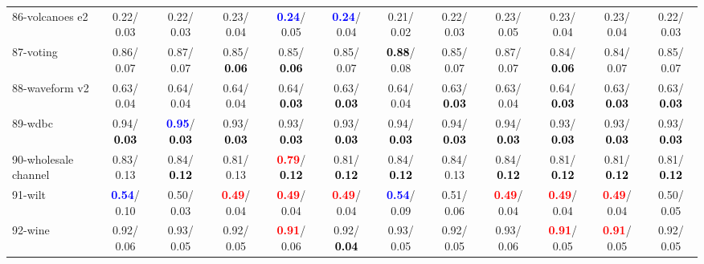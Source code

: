 \begin{table}[h]
\begin{center}
{\begin{tabular}{lc|c|c|c|c|c|c|c|c|c|c}
86-volcanoes e2 &   0.22/  0.03 &   0.22/  0.03 &   0.23/  0.04 & \textcolor{blue}{\textbf{  0.24}}/  0.05 & \textcolor{blue}{\textbf{  0.24}}/  0.04 &   0.21/  0.02 &   0.22/  0.03 &   0.23/  0.05 &   0.23/  0.04 &   0.23/  0.04 &   0.22/  0.03 \\
87-voting &   0.86/  0.07 &   0.87/  0.07 &   0.85/\textcolor{black}{\textbf{  0.06}} &   0.85/\textcolor{black}{\textbf{  0.06}} &   0.85/  0.07 & \textcolor{black}{\textbf{  0.88}}/  0.08 &   0.85/  0.07 &   0.87/  0.07 &   0.84/\textcolor{black}{\textbf{  0.06}} &   0.84/  0.07 &   0.85/  0.07 \\
88-waveform v2 &   0.63/  0.04 &   0.64/  0.04 &   0.64/  0.04 &   0.64/\textcolor{black}{\textbf{  0.03}} &   0.63/\textcolor{black}{\textbf{  0.03}} &   0.64/  0.04 &   0.63/\textcolor{black}{\textbf{  0.03}} &   0.63/  0.04 &   0.64/\textcolor{black}{\textbf{  0.03}} &   0.63/\textcolor{black}{\textbf{  0.03}} &   0.63/\textcolor{black}{\textbf{  0.03}} \\
89-wdbc &   0.94/\textcolor{black}{\textbf{  0.03}} & \textcolor{blue}{\textbf{  0.95}}/\textcolor{black}{\textbf{  0.03}} &   0.93/\textcolor{black}{\textbf{  0.03}} &   0.93/\textcolor{black}{\textbf{  0.03}} &   0.93/\textcolor{black}{\textbf{  0.03}} &   0.94/\textcolor{black}{\textbf{  0.03}} &   0.94/\textcolor{black}{\textbf{  0.03}} &   0.94/\textcolor{black}{\textbf{  0.03}} &   0.93/\textcolor{black}{\textbf{  0.03}} &   0.93/\textcolor{black}{\textbf{  0.03}} &   0.93/\textcolor{black}{\textbf{  0.03}} \\
90-wholesale channel &   0.83/  0.13 &   0.84/\textcolor{black}{\textbf{  0.12}} &   0.81/  0.13 & \textcolor{red}{\textbf{  0.79}}/\textcolor{black}{\textbf{  0.12}} &   0.81/\textcolor{black}{\textbf{  0.12}} &   0.84/\textcolor{black}{\textbf{  0.12}} &   0.84/  0.13 &   0.84/\textcolor{black}{\textbf{  0.12}} &   0.81/\textcolor{black}{\textbf{  0.12}} &   0.81/\textcolor{black}{\textbf{  0.12}} &   0.81/\textcolor{black}{\textbf{  0.12}} \\
91-wilt & \textcolor{blue}{\textbf{  0.54}}/  0.10 &   0.50/  0.03 & \textcolor{red}{\textbf{  0.49}}/  0.04 & \textcolor{red}{\textbf{  0.49}}/  0.04 & \textcolor{red}{\textbf{  0.49}}/  0.04 & \textcolor{blue}{\textbf{  0.54}}/  0.09 &   0.51/  0.06 & \textcolor{red}{\textbf{  0.49}}/  0.04 & \textcolor{red}{\textbf{  0.49}}/  0.04 & \textcolor{red}{\textbf{  0.49}}/  0.04 &   0.50/  0.05 \\
92-wine &   0.92/  0.06 &   0.93/  0.05 &   0.92/  0.05 & \textcolor{red}{\textbf{  0.91}}/  0.06 &   0.92/\textcolor{black}{\textbf{  0.04}} &   0.93/  0.05 &   0.92/  0.05 &   0.93/  0.06 & \textcolor{red}{\textbf{  0.91}}/  0.05 & \textcolor{red}{\textbf{  0.91}}/  0.05 &   0.92/  0.05 \\ \hline

\end{tabular}}
\end{center}
\end{table}
